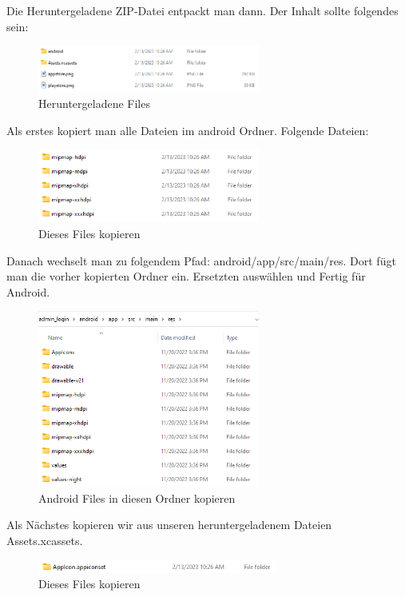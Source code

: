\newpage

Die Heruntergeladene ZIP-Datei entpackt man dann. Der Inhalt sollte folgendes sein:
\begin{figure}[!h]
\centering
\includegraphics[width=0.65\textwidth]{FLUTTER/images/ZB/downloaded_files.png}
\caption{Heruntergeladene Files}
\end{figure}

Als erstes kopiert man alle Dateien im android Ordner. Folgende Dateien:
\begin{figure}[!h]
\centering
\includegraphics[width=0.65\textwidth]{FLUTTER/images/ZB/downloaded_android_icons.png}
\caption{Dieses Files kopieren}
\end{figure}

Danach wechselt man zu folgendem Pfad: android/app/src/main/res. Dort fügt man die vorher kopierten Ordner ein. Ersetzten auswählen und Fertig für Android.
\begin{figure}[!h]
\centering
\includegraphics[width=0.65\textwidth]{FLUTTER/images/ZB/android_icons_copy_to.png}
\caption{Android Files in diesen Ordner kopieren}
\end{figure}

\newpage

Als Nächstes kopieren wir aus unseren heruntergeladenem Dateien Assets.xcassets.
\begin{figure}[!h]
\centering
\includegraphics[width=0.7\textwidth]{FLUTTER/images/ZB/downloaded_ios_icons.png}
\caption{Dieses Files kopieren}
\end{figure}

